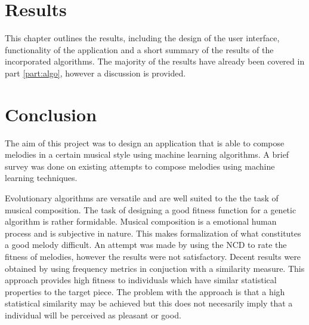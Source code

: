 

\chapter{Results}
This chapter outlines the results, including the design of the user interface, functionality of the application and a short summary of the results of the incorporated algorithms.
The majority of the results have already been covered in part \ref{part:algo}, however a discussion is provided.


\chapter{Conclusion}
The aim of this project was to design an application that is able to compose melodies in a certain musical style using machine learning algorithms. A brief survey was done on existing attempts to compose melodies using machine learning techniques.

Evolutionary algorithms are versatile and are well suited to the the task of musical composition. The task of designing a good fitness function for a genetic algorithm is rather formidable.
Musical composition is a emotional human process and is subjective in nature. This makes formalization of what constitutes a good melody difficult. 
An attempt was made by using the \ac{NCD} to rate the fitness of melodies, however the results were not satisfactory.
Decent results were obtained by using frequency metrics in conjuction with a similarity measure. This approach provides high fitness to individuals which have similar statistical properties to the target piece. The problem with the approach is that a high statistical similarity may be achieved but this does not necesarily imply that a individual will be perceived as pleasant or good.

